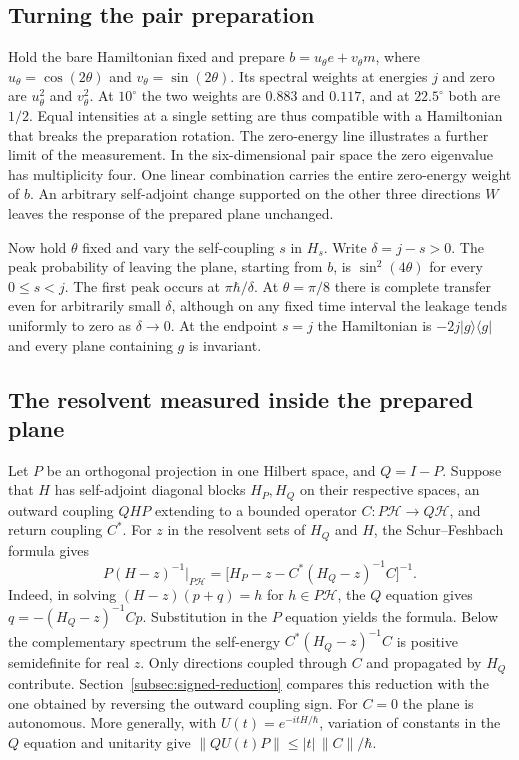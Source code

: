 \documentclass[11pt]{article}
\theoremstyle{definition}
\newcommand{\ket}[1]{\lvert #1\rangle}
\newcommand{\bra}[1]{\langle #1\rvert}
\begin{document}
\subsection{Turning the pair preparation}

Hold the bare Hamiltonian fixed and prepare $b=u_\theta e+v_\theta m$, where $u_\theta=\cos(2\theta)$ and $v_\theta=\sin(2\theta)$. Its spectral weights at energies $j$ and zero are $u_\theta^2$ and $v_\theta^2$. At $10^\circ$ the two weights are $0.883$ and $0.117$, and at $22.5^\circ$ both are $1/2$. Equal intensities at a single setting are thus compatible with a Hamiltonian that breaks the preparation rotation. The zero-energy line illustrates a further limit of the measurement. In the six-dimensional pair space the zero eigenvalue has multiplicity four. One linear combination carries the entire zero-energy weight of $b$. An arbitrary self-adjoint change supported on the other three directions $W$ leaves the response of the prepared plane unchanged.

Now hold $\theta$ fixed and vary the self-coupling $s$ in $H_s$. Write $\delta=j-s>0$. The peak probability of leaving the plane, starting from $b$, is $\sin^2(4\theta)$ for every $0\le s<j$. The first peak occurs at $\pi\hbar/\delta$. At $\theta=\pi/8$ there is complete transfer even for arbitrarily small $\delta$, although on any fixed time interval the leakage tends uniformly to zero as $\delta\to0$. At the endpoint $s=j$ the Hamiltonian is $-2j\ket{g}\bra{g}$ and every plane containing $g$ is invariant.

\subsection{The resolvent measured inside the prepared plane}

Let $P$ be an orthogonal projection in one Hilbert space, and $Q=I-P$. Suppose that $H$ has self-adjoint diagonal blocks $H_P,H_Q$ on their respective spaces, an outward coupling $QHP$ extending to a bounded operator $C:P\mathcal H\to Q\mathcal H$, and return coupling $C^*$. For $z$ in the resolvent sets of $H_Q$ and $H$, the Schur--Feshbach formula gives \cite{DussonSigalStamm}
\begin{equation}
 P(H-z)^{-1}\big|_{P\mathcal H}
 =\big[H_P-z-C^*(H_Q-z)^{-1}C\big]^{-1}.
 \label{eq:prepared-schur}
\end{equation}
Indeed, in solving $(H-z)(p+q)=h$ for $h\in P\mathcal H$, the $Q$ equation gives $q=-(H_Q-z)^{-1}Cp$. Substitution in the $P$ equation yields the formula. Below the complementary spectrum the self-energy $C^*(H_Q-z)^{-1}C$ is positive semidefinite for real $z$. Only directions coupled through $C$ and propagated by $H_Q$ contribute. Section~\ref{subsec:signed-reduction} compares this reduction with the one obtained by reversing the outward coupling sign. For $C=0$ the plane is autonomous. More generally, with $U(t)=e^{-itH/\hbar}$, variation of constants in the $Q$ equation and unitarity give $\|QU(t)P\|\le |t|\,\|C\|/\hbar$.
\end{document}
